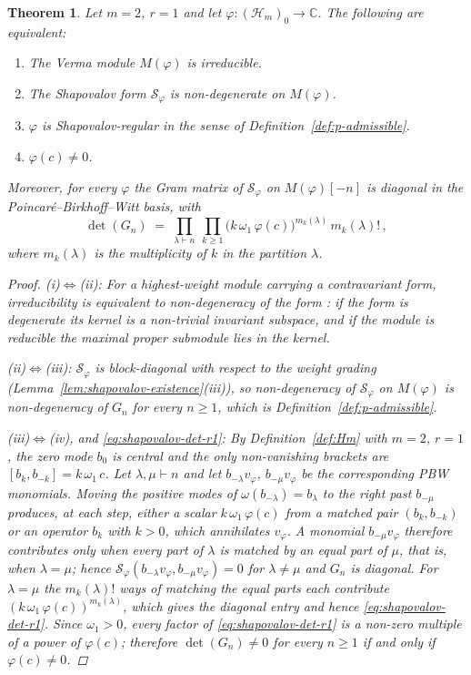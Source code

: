 \documentclass[12pt]{amsart}
\theoremstyle{plain}
\newtheorem{theorem}{Theorem}[section]
\theoremstyle{definition}
\newcommand{\CC}{\mathbb{C}}
\newcommand{\Hm}{{\mathcal{H}_m}}     %
\newcommand{\Mf}{M(\varphi)}          %
\newcommand{\Sf}{\mathcal{S}_\varphi} %
\newcommand{\vf}{v_\varphi}           %
\begin{document}
\begin{theorem}
\label{thm:irreducibility}
Let $m = 2$, $r = 1$ and let $\varphi : (\Hm)_0 \to \CC$. The following
are equivalent:
\begin{enumerate}[label=(\roman*)]
  \item The Verma module $\Mf$ is irreducible.
  \item The Shapovalov form $\Sf$ is non-degenerate on $\Mf$.
  \item $\varphi$ is Shapovalov-regular in the sense of
        Definition~\textup{\ref{def:p-admissible}}.
  \item $\varphi(c) \neq 0$.
\end{enumerate}
Moreover, for every $\varphi$ the Gram matrix of $\Sf$ on $\Mf[-n]$ is
diagonal in the Poincar\'e--Birkhoff--Witt basis, with
\begin{equation}\label{eq:shapovalov-det-r1}
  \det(G_n)
  \;=\;
  \prod_{\lambda \vdash n}\ \prod_{k\ge 1}
    \bigl(k\,\omega_1\,\varphi(c)\bigr)^{m_k(\lambda)}\, m_k(\lambda)!\,,
\end{equation}
where $m_k(\lambda)$ is the multiplicity of $k$ in the partition
$\lambda$.
\begin{proof}
\textit{(i)$\Leftrightarrow$(ii):} For a highest-weight module carrying
a contravariant form, irreducibility is equivalent to non-degeneracy of
the form \cite[Ch.~2]{KacRaina}: if the form is degenerate its kernel is
a non-trivial invariant subspace, and if the module is reducible the
maximal proper submodule lies in the kernel.

\textit{(ii)$\Leftrightarrow$(iii):} $\Sf$ is block-diagonal with
respect to the weight grading (Lemma~\ref{lem:shapovalov-existence}(iii)),
so non-degeneracy of $\Sf$ on $\Mf$ is non-degeneracy of $G_n$ for every
$n\ge 1$, which is Definition~\ref{def:p-admissible}.

\textit{(iii)$\Leftrightarrow$(iv), and \eqref{eq:shapovalov-det-r1}:}
By Definition~\ref{def:Hm} with $m=2$, $r=1$, the zero mode $b_0$ is
central and the only non-vanishing brackets are
$[b_k, b_{-k}] = k\,\omega_1\,c$. Let $\lambda,\mu \vdash n$ and let
$b_{-\lambda}\vf$, $b_{-\mu}\vf$ be the corresponding PBW monomials.
Moving the positive modes of $\omega(b_{-\lambda}) = b_{\lambda}$ to the
right past $b_{-\mu}$ produces, at each step, either a scalar
$k\,\omega_1\,\varphi(c)$ from a matched pair $(b_k, b_{-k})$ or an
operator $b_k$ with $k>0$, which annihilates $\vf$. A monomial
$b_{-\mu}\vf$ therefore contributes only when every part of $\lambda$ is
matched by an equal part of $\mu$, that is, when $\lambda = \mu$; hence
$\Sf(b_{-\lambda}\vf, b_{-\mu}\vf) = 0$ for $\lambda\neq\mu$ and $G_n$
is diagonal. For $\lambda = \mu$ the $m_k(\lambda)!$ ways of matching
the equal parts each contribute $(k\,\omega_1\,\varphi(c))^{m_k(\lambda)}$,
which gives the diagonal entry and hence
\eqref{eq:shapovalov-det-r1}. Since $\omega_1 > 0$, every factor of
\eqref{eq:shapovalov-det-r1} is a non-zero multiple of a power of
$\varphi(c)$; therefore $\det(G_n)\neq 0$ for every $n\ge 1$ if and only
if $\varphi(c) \neq 0$.
\end{proof}
\end{theorem}
\end{document}
